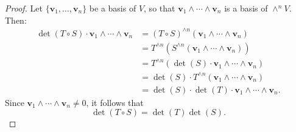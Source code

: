 \begin{proof}
Let \( \{\mathbf{v}_1, \dots, \mathbf{v}_n\} \) be a basis of \( V \), so that \( \mathbf{v}_1 \wedge \cdots \wedge \mathbf{v}_n \) is a basis of \( \wedge^n V \). Then:
\begin{align*}
\det(T \circ S) \cdot \mathbf{v}_1 \wedge \cdots \wedge \mathbf{v}_n 
  &= (T \circ S)^{\wedge n} (\mathbf{v}_1 \wedge \cdots \wedge \mathbf{v}_n) \\
  &= T^{\wedge n} \left( S^{\wedge n}(\mathbf{v}_1 \wedge \cdots \wedge \mathbf{v}_n) \right) \\
  &= T^{\wedge n} \left( \det(S) \cdot \mathbf{v}_1 \wedge \cdots \wedge \mathbf{v}_n \right) \\
  &= \det(S) \cdot T^{\wedge n}(\mathbf{v}_1 \wedge \cdots \wedge \mathbf{v}_n) \\
  &= \det(S) \cdot \det(T) \cdot \mathbf{v}_1 \wedge \cdots \wedge \mathbf{v}_n.
\end{align*}
Since \( \mathbf{v}_1 \wedge \cdots \wedge \mathbf{v}_n \neq 0 \), it follows that
\[
\det(T \circ S) = \det(T)\det(S).
\]
\end{proof}



